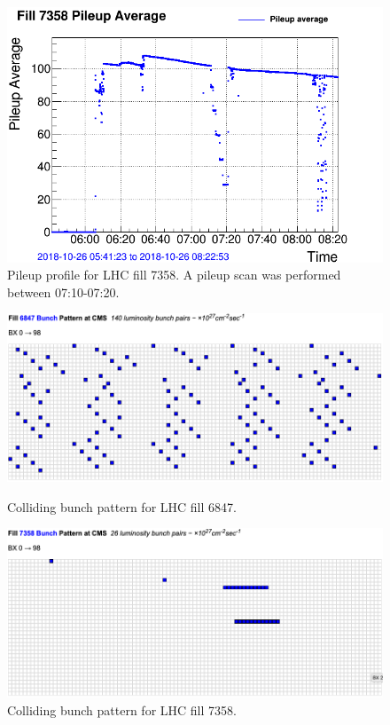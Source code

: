 \begin{figure}[hbt]
  \begin{center}
    \includegraphics[width=0.55\linewidth]{plots/fill_7358_pileup_avg.png}
    \caption{
      Pileup profile for LHC fill 7358. A pileup scan was performed between  07:10-07:20.
      \label{fig:fillpu7358}
    }
  \end{center}
\end{figure}

\clearpage
\begin{figure}[hbt]
  \begin{center}

    \includegraphics[width=0.99\linewidth]{plots/fillpattern_6847.png}
    \caption{
      Colliding bunch pattern for LHC fill 6847. 
    \label{fig:fill6847pattern}
    }

    \vspace{12pt}
    
    \includegraphics[width=0.99\linewidth]{plots/fillpattern_7358.png}
    \caption{
      Colliding bunch pattern for LHC fill 7358. 
    \label{fig:fill7358pattern}
    }

  \end{center}
\end{figure}

